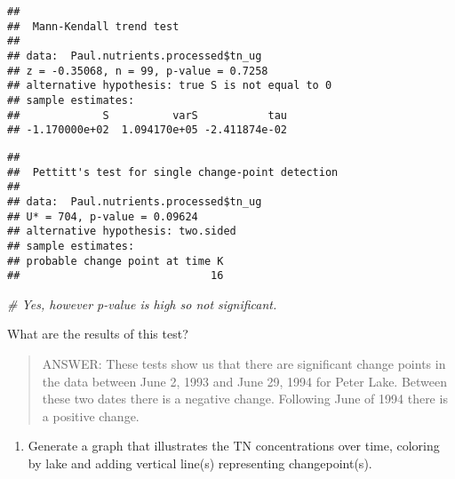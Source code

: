 \documentclass[]{article}
\newenvironment{Shaded}{\begin{snugshade}}{\end{snugshade}}
\newcommand{\KeywordTok}[1]{\textcolor[rgb]{0.13,0.29,0.53}{\textbf{#1}}}
\newcommand{\CommentTok}[1]{\textcolor[rgb]{0.56,0.35,0.01}{\textit{#1}}}
\newcommand{\OperatorTok}[1]{\textcolor[rgb]{0.81,0.36,0.00}{\textbf{#1}}}
\newcommand{\NormalTok}[1]{#1}
\providecommand{\tightlist}{%
  \setlength{\itemsep}{0pt}\setlength{\parskip}{0pt}}
\begin{document}
\begin{verbatim}
## 
##  Mann-Kendall trend test
## 
## data:  Paul.nutrients.processed$tn_ug
## z = -0.35068, n = 99, p-value = 0.7258
## alternative hypothesis: true S is not equal to 0
## sample estimates:
##             S          varS           tau 
## -1.170000e+02  1.094170e+05 -2.411874e-02
\end{verbatim}

\begin{Shaded}
\end{Shaded}

\begin{verbatim}
## 
##  Pettitt's test for single change-point detection
## 
## data:  Paul.nutrients.processed$tn_ug
## U* = 704, p-value = 0.09624
## alternative hypothesis: two.sided
## sample estimates:
## probable change point at time K 
##                              16
\end{verbatim}

\begin{Shaded}
\begin{Highlighting}[]
\CommentTok{# Yes, however p-value is high so not significant.}
\end{Highlighting}
\end{Shaded}

What are the results of this test?

\begin{quote}
ANSWER: These tests show us that there are significant change points in
the data between June 2, 1993 and June 29, 1994 for Peter Lake. Between
these two dates there is a negative change. Following June of 1994 there
is a positive change.
\end{quote}

\begin{enumerate}
\def\labelenumi{\arabic{enumi}.}
\setcounter{enumi}{4}
\tightlist
\item
  Generate a graph that illustrates the TN concentrations over time,
  coloring by lake and adding vertical line(s) representing
  changepoint(s).
\end{enumerate}
\end{document}
